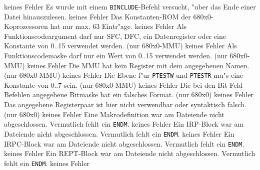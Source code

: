 \documentclass[12pt,a4paper,twoside]{report}
\newcommand{\tty}[1]{{\tt #1}}
\begin{document}
\begin{description}
               {keines}
               {Fehler}
               {Es wurde mit einem \tty{BINCLUDE}-Befehl versucht,
                "uber das Ende einer Datei hinauszulesen.}
               {keines}
               {Fehler}
               {Das Konstanten-ROM der 680x0-Koprozessoren hat
                nur max. 63 Eintr"age.}
               {keines}
               {Fehler}
               {Als Funktionscodeargument darf nur SFC, DFC, ein
                Datenregister oder eine Konstante von 0..15 verwendet
                werden. (nur 680x0-MMU)}
               {keines}
               {Fehler}
               {Als Funktionscodemaske darf nur ein Wert von
                0..15 verwendet werden. (nur 680x0-MMU)}
               {keines}
               {Fehler}
               {Die MMU hat kein Register mit dem angegebenen
                Namen. (nur 680x0-MMU)}
               {keines}
               {Fehler}
               {Die Ebene f"ur \tty{PTESTW} und \tty{PTESTR} mu"s eine
                Konstante von 0..7 sein. (nur 680x0-MMU)}
               {keines}
               {Fehler}
               {Die bei den Bit-Feld-Befehlen angegebene
                Bitmaske hat ein falsches Format. (nur 680x0)}
               {keines}
               {Fehler}
               {Das angegebene Registerpaar ist hier nicht
                verwendbar oder syntaktisch falsch. (nur 680x0)}
               {keines}
               {Fehler}
               {Eine Makrodefinition war am Dateiende nicht
                abgeschlossen.  Vermutlich fehlt ein \tty{ENDM}.}
               {keines}
               {Fehler}
               {Ein IRP-Block war am Dateiende nicht
                abgeschlossen.  Vermutlich fehlt ein \tty{ENDM}.}
               {keines}
               {Fehler}
               {Ein IRPC-Block war am Dateiende nicht
                abgeschlossen.  Vermutlich fehlt ein \tty{ENDM}.}
               {keines}
               {Fehler}
               {Ein REPT-Block war am Dateiende nicht
                abgeschlossen.  Vermutlich fehlt ein \tty{ENDM}.}
               {keines}
               {Fehler}

\end{description}
\end{document}
